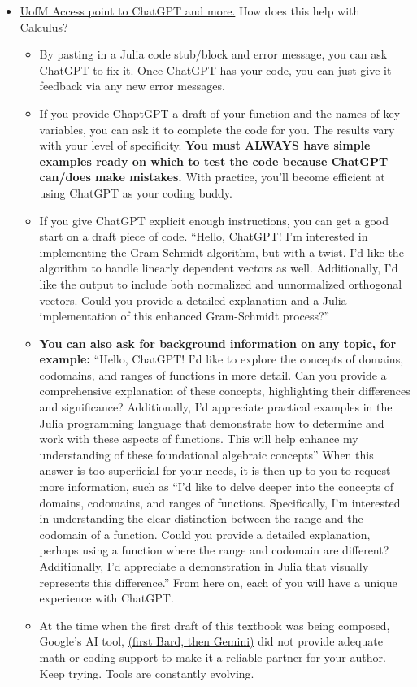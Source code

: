 \begin{itemize}
    \item \href{https://genai.umich.edu/}{UofM Access point to ChatGPT and more.} How does this help with Calculus?
    \begin{itemize}
        \item By pasting in a Julia code stub/block and error message, you can ask ChatGPT to fix it. Once ChatGPT has your code, you can just give it feedback via any new error messages.
        \item If you provide ChaptGPT a draft of your function and the names of key variables, you can ask it to complete the code for you. The results vary with your level of specificity. \textbf{You must ALWAYS have simple examples ready on which to test the code because ChatGPT can/does make mistakes.} With practice, you'll become efficient at using ChatGPT as your coding buddy.
        \item If you give ChatGPT explicit enough instructions, you can get a good start on a draft piece of code. ``Hello, ChatGPT! I'm interested in implementing the Gram-Schmidt algorithm, but with a twist. I'd like the algorithm to handle linearly dependent vectors as well. Additionally, I'd like the output to include both normalized and unnormalized orthogonal vectors. Could you provide a detailed explanation and a Julia implementation of this enhanced Gram-Schmidt process?''
        
        \item \textbf{You can also ask for background information on any topic, for example:} ``Hello, ChatGPT! I'd like to explore the concepts of domains, codomains, and ranges of functions in more detail. Can you provide a comprehensive explanation of these concepts, highlighting their differences and significance? Additionally, I'd appreciate practical examples in the Julia programming language that demonstrate how to determine and work with these aspects of functions. This will help enhance my understanding of these foundational algebraic concepts'' When this answer is too superficial for your needs, it is then up to you to request more information, such as ``I'd like to delve deeper into the concepts of domains, codomains, and ranges of functions. Specifically, I'm interested in understanding the clear distinction between the range and the codomain of a function. Could you provide a detailed explanation, perhaps using a function where the range and codomain are different? Additionally, I'd appreciate a demonstration in Julia that visually represents this difference.'' From here on, each of you will have a unique experience with ChatGPT. 
        
        \item At the time when the first draft of this textbook was being composed, Google's AI tool, \href{https://gemini.google.com/app?utm_source=sem&utm_medium=paid-media&utm_campaign=q4enUS_sem1}{(first Bard, then Gemini)} did not provide adequate math or coding support to make it a reliable partner for your author. Keep trying. Tools are constantly evolving. 
    \end{itemize}
\end{itemize}

